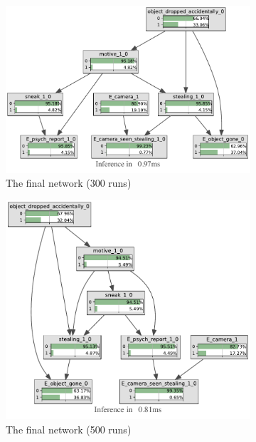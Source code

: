 \documentclass[12pt]{article}
\begin{document}
\begin{figure}[htbp]
\begin{center}
\begin{subfigure}{0.45\textwidth}
\includegraphics[width=\linewidth]{GroteMarktPrivate/bnImage/BNIMAGEGroteMarktPrivate300.pdf}
\caption{The final network (300 runs)}
\end{subfigure}
\begin{subfigure}{0.45\textwidth}
\includegraphics[width=\linewidth]{GroteMarktPrivate/bnImage/BNIMAGEGroteMarktPrivate500.pdf}
\caption{The final network (500 runs)}
\end{subfigure}
\begin{subfigure}{0.45\textwidth}

\end{subfigure}
\end{center}
\end{figure}
\end{document}
